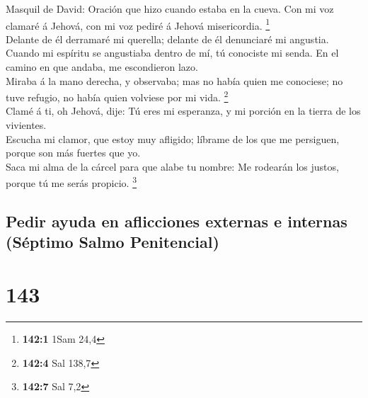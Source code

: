  Masquil de David: Oración que hizo cuando estaba en la
cueva. Con mi voz clamaré á Jehová, con mi voz pediré á Jehová
misericordia. \footnote{\textbf{142:1} 1Sam 24,4}\\
 Delante de él derramaré mi querella; delante de él
denunciaré mi angustia.\\
 Cuando mi espíritu se angustiaba dentro de mí, tú
conociste mi senda. En el camino en que andaba, me escondieron lazo.\\
 Miraba á la mano derecha, y observaba; mas no había quien
me conociese; no tuve refugio, no había quien volviese por mi vida.
\footnote{\textbf{142:4} Sal 138,7}\\
 Clamé á ti, oh Jehová, dije: Tú eres mi esperanza, y mi
porción en la tierra de los vivientes.\\
 Escucha mi clamor, que estoy muy afligido; líbrame de los
que me persiguen, porque son más fuertes que yo.\\
 Saca mi alma de la cárcel para que alabe tu nombre: Me
rodearán los justos, porque tú me serás propicio. \footnote{\textbf{142:7}
  Sal 7,2}

\hypertarget{pedir-ayuda-en-aflicciones-externas-e-internas-suxe9ptimo-salmo-penitencial}{%
\subsection{Pedir ayuda en aflicciones externas e internas (Séptimo
Salmo
Penitencial)}\label{pedir-ayuda-en-aflicciones-externas-e-internas-suxe9ptimo-salmo-penitencial}}

\hypertarget{section-142}{%
\section{143}\label{section-142}}

